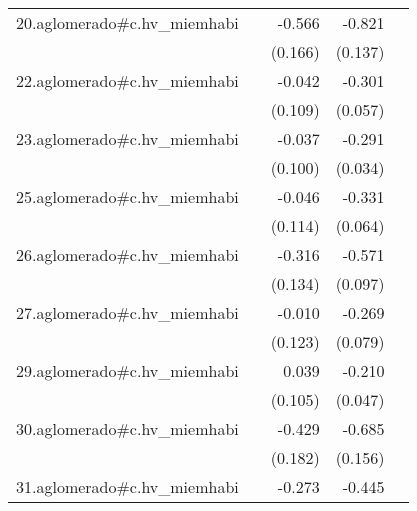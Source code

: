 {\begin{longtable}{l*{4}{D{.}{.}{-1}}}
\addlinespace
20.aglomerado#c.hv\_miemhabi&                     &      -0.566\sym{***}&      -0.821\sym{***}&                     \\
            &                     &     (0.166)         &     (0.137)         &                     \\
\addlinespace
22.aglomerado#c.hv\_miemhabi&                     &      -0.042         &      -0.301\sym{***}&                     \\
            &                     &     (0.109)         &     (0.057)         &                     \\
\addlinespace
23.aglomerado#c.hv\_miemhabi&                     &      -0.037         &      -0.291\sym{***}&                     \\
            &                     &     (0.100)         &     (0.034)         &                     \\
\addlinespace
25.aglomerado#c.hv\_miemhabi&                     &      -0.046         &      -0.331\sym{***}&                     \\
            &                     &     (0.114)         &     (0.064)         &                     \\
\addlinespace
26.aglomerado#c.hv\_miemhabi&                     &      -0.316\sym{*}  &      -0.571\sym{***}&                     \\
            &                     &     (0.134)         &     (0.097)         &                     \\
\addlinespace
27.aglomerado#c.hv\_miemhabi&                     &      -0.010         &      -0.269\sym{***}&                     \\
            &                     &     (0.123)         &     (0.079)         &                     \\
\addlinespace
29.aglomerado#c.hv\_miemhabi&                     &       0.039         &      -0.210\sym{***}&                     \\
            &                     &     (0.105)         &     (0.047)         &                     \\
\addlinespace
30.aglomerado#c.hv\_miemhabi&                     &      -0.429\sym{*}  &      -0.685\sym{***}&                     \\
            &                     &     (0.182)         &     (0.156)         &                     \\
\addlinespace
31.aglomerado#c.hv\_miemhabi&                     &      -0.273\sym{*}  &      -0.445\sym{***}&                     \\

\end{longtable}}
